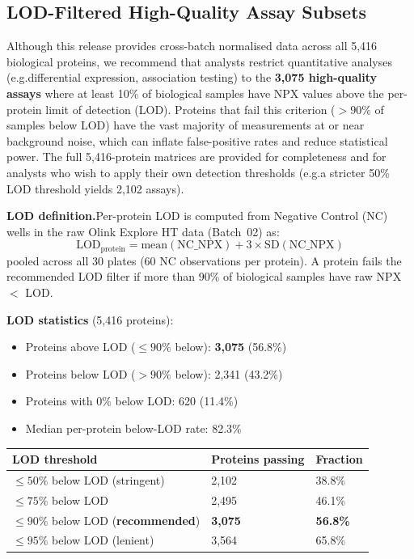 \documentclass[11pt,a4paper]{article}
\begin{document}
\subsection{LOD-Filtered High-Quality Assay Subsets}

\begin{tcolorbox}[colback=yellow!5,colframe=orange!60,boxrule=0.5pt,
                  title=Analyst Recommendation]
Although this release provides cross-batch normalised data across all 5,416
biological proteins, we recommend that analysts restrict quantitative
analyses (e.g.\@ differential expression, association testing) to the
\textbf{3,075 high-quality assays} where at least 10\% of biological
samples have NPX values above the per-protein limit of detection (LOD).
Proteins that fail this criterion ($>90\%$ of samples below LOD) have the
vast majority of measurements at or near background noise, which can inflate
false-positive rates and reduce statistical power. The full 5,416-protein
matrices are provided for completeness and for analysts who wish to apply
their own detection thresholds (e.g.\@ a stricter 50\% LOD threshold yields
2,102 assays).
\end{tcolorbox}

\textbf{LOD definition.}\enspace Per-protein LOD is computed from Negative
Control (NC) wells in the raw Olink Explore HT data (Batch~02) as:
\[
  \text{LOD}_{\text{protein}}
    = \text{mean}(\text{NC\_NPX})
    + 3 \times \text{SD}(\text{NC\_NPX})
\]
pooled across all 30 plates (60 NC observations per protein). A protein
fails the recommended LOD filter if more than 90\% of biological samples
have raw NPX $<$ LOD.

\textbf{LOD statistics} (5,416 proteins):
\begin{itemize}
  \item Proteins above LOD ($\leq 90\%$ below): \textbf{3,075} (56.8\%)
  \item Proteins below LOD ($> 90\%$ below): 2,341 (43.2\%)
  \item Proteins with 0\% below LOD: 620 (11.4\%)
  \item Median per-protein below-LOD rate: 82.3\%
\end{itemize}

{\footnotesize
\renewcommand{\arraystretch}{1.2}
\begin{longtable}{p{5.5cm}p{3cm}p{2cm}}
\toprule
\textbf{LOD threshold} & \textbf{Proteins passing} & \textbf{Fraction} \\
\midrule
$\leq 50\%$ below LOD (stringent) & 2,102 & 38.8\% \\
$\leq 75\%$ below LOD & 2,495 & 46.1\% \\
$\leq 90\%$ below LOD (\textbf{recommended}) & \textbf{3,075} & \textbf{56.8\%} \\
$\leq 95\%$ below LOD (lenient) & 3,564 & 65.8\% \\
\bottomrule
\end{longtable}
\renewcommand{\arraystretch}{1.0}
}
\end{document}
